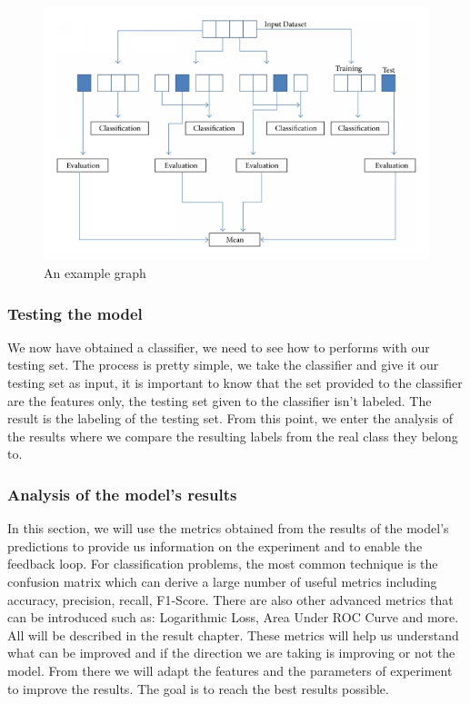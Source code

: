 \begin{figure}[h]
\centering
\includegraphics[scale=.3]{img/K-fold-cross-validation.png}
\caption{An example graph}
\label{fig:x cubed graph}
\end{figure}

\subsubsection{Testing the model}
We now have obtained a classifier, we need to see how to performs with our testing set. The process is pretty simple, we take the classifier and give it our testing set as input, it is important to know that the set provided to the classifier are the features only, the testing set given to the classifier isn't labeled. The result is the labeling of the testing set. From this point, we enter the analysis of the results where we compare the resulting labels from the real class they belong to.

\subsubsection{Analysis of the model's results}
In this section, we will use the metrics obtained from the results of the model's predictions to provide us information on the experiment and to enable the feedback loop. For classification problems, the most common technique is the confusion matrix which can derive a large number of useful metrics including accuracy, precision, recall, F1-Score. There are also other advanced metrics \cite{ml-metrics} that can be introduced such as: Logarithmic Loss, Area Under ROC Curve and more. All will be described in the result chapter.
These metrics will help us understand what can be improved and if the direction we are taking is improving or not the model. From there we will adapt the features and the parameters of experiment to improve the results. The goal is to reach the best results possible.


